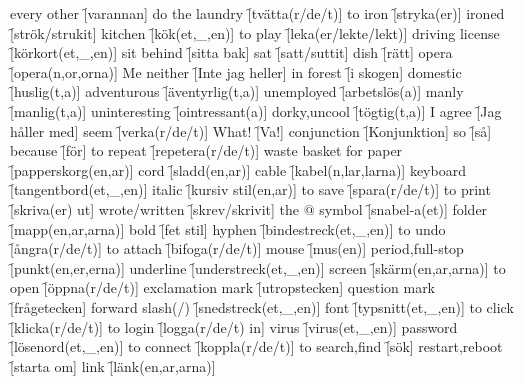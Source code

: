 \begin{questions}
\begin{multicols}{2}
        \question every other \f[varannan]
        \question do the laundry \f[tvätta(r/de/t)]
        \question to iron \f[stryka(er)]
        \question ironed \f[strök/strukit]
        \question kitchen \f[kök(et,\_,en)]
        \question to play \f[leka(er/lekte/lekt)]
        \question driving license \f[körkort(et,\_,en)]
        \question sit behind \f[sitta bak]
        \question sat \f[satt/suttit]
        \question dish \f[rätt]
        \question opera \f[opera(n,or,orna)]
        \question Me neither \f[Inte jag heller]
        \question in forest \f[i skogen]
        \question domestic \f[huslig(t,a)]
        \question adventurous \f[äventyrlig(t,a)]
        \question unemployed \f[arbetslös(a)]
        \question manly \f[manlig(t,a)]
        \question uninteresting \f[ointressant(a)]
        \question dorky,uncool \f[tögtig(t,a)]
        \question I agree \f[Jag håller med]
        \question seem \f[verka(r/de/t)]
        \question What! \f[Va!]
        \question conjunction \f[Konjunktion]
        \question so \f[så]
        \question because \f[för]
        \question to repeat \f[repetera(r/de/t)]
        \question waste basket for paper \f[papperskorg(en,ar)]
        \question cord \f[sladd(en,ar)]
        \question cable \f[kabel(n,lar,larna)]
        \question keyboard \f[tangentbord(et,\_,en)]
        \question italic \f[kursiv stil(en,ar)]
        \question to save \f[spara(r/de/t)]
        \question to print \f[skriva(er) ut]
        \question wrote/written \f[skrev/skrivit]
        \question the $@$ symbol \f[snabel-a(et)]
        \question folder \f[mapp(en,ar,arna)]
        \question bold \f[fet stil]
        \question hyphen \f[bindestreck(et,\_,en)]
        \question to undo \f[ångra(r/de/t)]
        \question to attach \f[bifoga(r/de/t)]
        \question mouse \f[mus(en)]
        \question period,full-stop \f[punkt(en,er,erna)]
        \question underline \f[understreck(et,\_,en)]
        \question screen \f[skärm(en,ar,arna)]
        \question to open \f[öppna(r/de/t)]
        \question exclamation mark \f[utropstecken]
        \question question mark \f[frågetecken]
        \question forward slash(/) \f[snedstreck(et,\_,en)]
        \question font \f[typsnitt(et,\_,en)]
        \question to click \f[klicka(r/de/t)]
        \question to login \f[logga(r/de/t) in]
        \question virus \f[virus(et,\_,en)]
        \question password \f[lösenord(et,\_,en)]
        \question to connect \f[koppla(r/de/t)]
        \question to search,find \f[sök]
        \question restart,reboot \f[starta om]
        \question link \f[länk(en,ar,arna)]

\end{multicols}
\end{questions}
